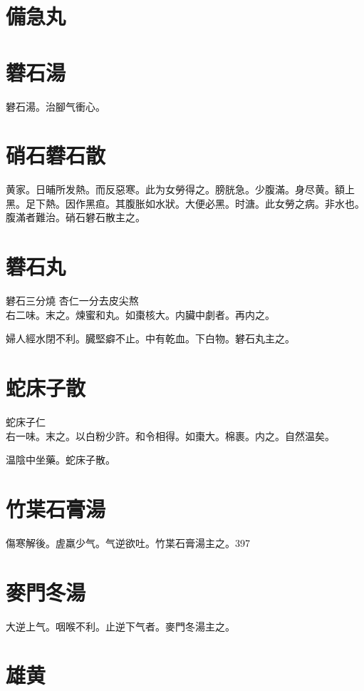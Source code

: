 \section{備急丸}

\section{礬石湯}

礬石湯。治腳气衝心。

\section{硝石礬石散}

黄家。日晡所发熱。而反惡寒。此为女勞得之。膀胱急。少腹滿。身尽黄。額上黑。足下熱。因作黑疸。其腹胀如水狀。大便必黑。时溏。此女勞之病。非水也。腹滿者難治。硝石礬石散主之。

\section{礬石丸}

礬石{\scriptsize 三分燒} 杏仁{\scriptsize 一分去皮尖熬}\\
右二味。末之。煉蜜和丸。如棗核大。内臟中劇者。再内之。

婦人經水閉不利。臓堅癖不止。中有乾血。下白物。礬石丸主之。

\section{蛇床子散}

蛇床子仁\\
右一味。末之。以白粉少許。和令相得。如棗大。棉裹。内之。自然温矣。

温陰中坐藥。蛇床子散。

\section{竹枼石膏湯}

傷寒解後。虗羸少气。气逆欲吐。竹枼石膏湯主之。397

\section{麥門冬湯}

大逆上气。咽喉不利。止逆下气者。麥門冬湯主之。

\section{雄黄}


